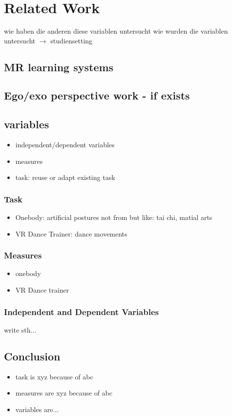 \chapter{Related Work}
wie haben die anderen diese variablen untersucht
wie wurden die variablen untersucht $\rightarrow$ studiensetting
\section{MR learning systems}


\section{Ego/exo perspective work - if exists}

\section{variables}
\begin{itemize}
	\item independent/dependent variables
	\item measures
	\item task: reuse or adapt existing task
\end{itemize}
\subsection{Task}
\begin{itemize}
	\item Onebody: artificial postures not from but like: tai chi, matial arts
	\item VR Dance Trainer: dance movements
\end{itemize}
\subsection{Measures}
\begin{itemize}
	\item onebody
	\item VR Dance trainer
\end{itemize}
\subsection{Independent and Dependent Variables}
write sth...

\section{Conclusion}
\begin{itemize}
	\item task is xyz because of abc
	\item measures are xyz because of abc
	\item variables are...
\end{itemize}

